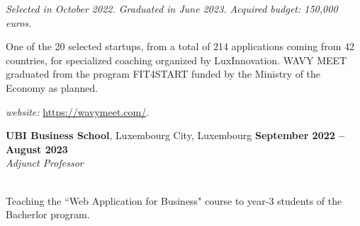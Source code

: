 \documentclass[margin,line]{resume}
\begin{document}
\begin{resume}
\begin{list2}
	\emph{Selected in October 2022. Graduated in June 2023. Acquired budget: 150,000 euros.}
	
	One of the 20 selected startups, from a total of 214 applications coming from 42 countries, for specialized coaching organized by LuxInnovation. WAVY MEET graduated from the program FIT4START funded by the Ministry of the Economy as planned.
	
	\item \filbreak\textit{website:} \url{https://wavymeet.com/}.
\end{list2}

\textbf{UBI Business School}, Luxembourg City, Luxembourg \hfill \textbf{September 2022 -- August 2023}\\
\textit{Adjunct Professor}\hfill\\
\vspace{-3mm}\\\vspace{-1mm}
\begin{list2}
	\item \filbreak Teaching the ``Web Application for Business" course to year-3 students of the Bacherlor program.
	\end{list2}


\end{resume}
\end{document}
